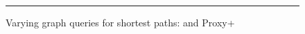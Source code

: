 \begin{figure}[t!]
\begin{center}
\end{center}
\caption{Varying graph queries for shortest paths: \ah and Proxy+\ah}
\label{fig:performance_path_queries_ah}
\hrule
\vspace{-2ex}
\end{figure}



